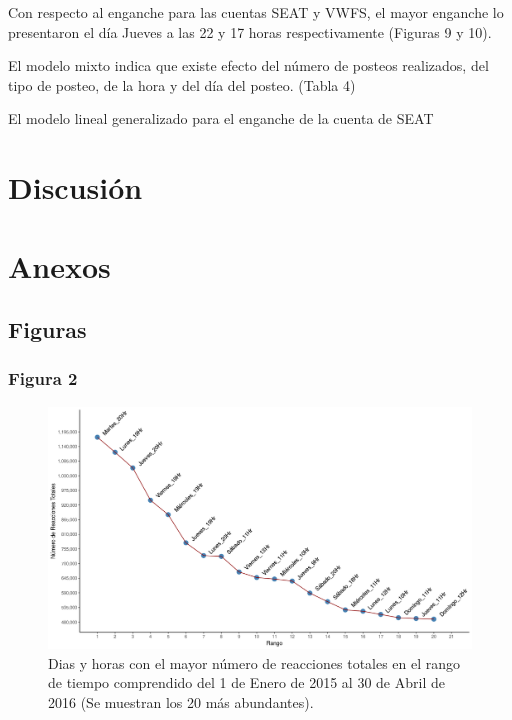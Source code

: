 \documentclass[a4paper,10pt]{article}
\begin{document}
Con respecto al enganche para las cuentas SEAT y VWFS, el
mayor enganche lo presentaron el día Jueves a las 22 y 17 horas
respectivamente (Figuras 9 y 10).

El modelo mixto indica  que existe efecto del número
de posteos realizados, del tipo de posteo, de la hora y
del día del posteo. (Tabla 4)

El modelo lineal generalizado para el enganche de la cuenta de SEAT 






\section{Discusión}

\section{Anexos}
\subsection{Figuras}
\subsubsection{Figura 2}
\begin{figure}[H]
  \begin{center}
   \includegraphics[width=.85\textwidth]{imagenes/figura2.png}
   \captionsetup{width=.80\textwidth}
   \caption{\centering Dias y horas con el mayor número de reacciones totales en el rango de tiempo
   comprendido del 1 de Enero de 2015 al 30 de Abril de 2016 (Se muestran los  20 más abundantes).}
  \end{center} 
\end{figure}
\end{document}
